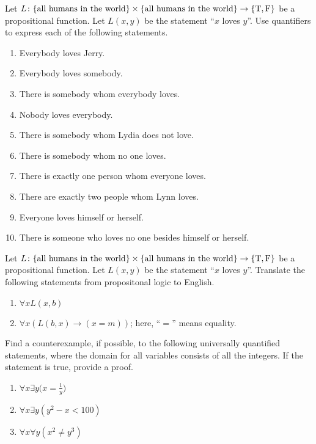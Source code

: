 \documentclass[../notes.tex]{subfiles}
\begin{document}
\begin{homework}
    Let $L\colon \{\text{all humans in the world}\} \times \{\text{all humans in the world}\}\rightarrow \{\text T, \text F\}$ be a propositional function. Let $L(x, y)$ be the statement ``$x$ loves $y$''. Use quantifiers to express each of the following statements.
    \begin{enumerate}[label=(\alph*)]
        \item Everybody loves Jerry.
        \item Everybody loves somebody.
        \item There is somebody whom everybody loves. 
        \item Nobody loves everybody. 
        \item There is somebody whom Lydia does not love.
        \item There is somebody whom no one loves.
        \item There is exactly one person whom everyone loves. 
        \item There are exactly two people whom Lynn loves.
        \item Everyone loves himself or herself. 
        \item There is someone who loves no one besides himself or herself. 
    \end{enumerate} 
\end{homework}
\begin{homework}
    Let $L\colon\{\text{all humans in the world}\} \times \{\text{all humans in the world}\}\rightarrow \{\text T, \text F\}$ be a propositional function. Let $L(x, y)$ be the statement ``$x$ loves $y$''. Translate the following statements from propositonal logic to English.
    \begin{enumerate}[label=(\alph*)]
        \item $\forall xL(x,b)$
        \item $\forall x(L(b,x)\to (x=m))$; here, ``$=$'' means equality.
    \end{enumerate}
\end{homework}
\begin{homework}
    Find a counterexample, if possible, to the following universally quantified statements, where the domain for all variables consists of all the integers. If the statement is true, provide a proof.
    \begin{enumerate}[label=(\alph*)]
        \item $\forall x \exists y \big(x = \frac{1}{y}\big)$
        \item $\forall x \exists y \left(y^2 - x < 100\right)$ 
        \item $\forall x \forall y \left(x^2 \neq y^3\right)$
    \end{enumerate}
\end{homework}
\end{document}
